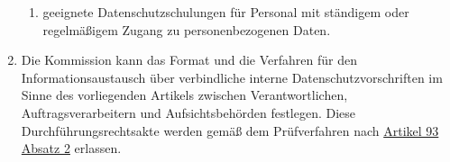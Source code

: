 \begin{enumerate}
\begin{enumerate}
    \item geeignete Datenschutzschulungen für Personal mit ständigem oder regelmäßigem Zugang zu personenbezogenen
     Daten.
    \label{itm:47-2n}

  \end{enumerate}

  \item Die Kommission kann das Format und die Verfahren für den Informationsaustausch über verbindliche interne
   Datenschutzvorschriften im Sinne des vorliegenden Artikels zwischen Verantwortlichen, Auftragsverarbeitern und
   Aufsichtsbehörden festlegen. Diese Durchführungsrechtsakte werden gemäß dem Prüfverfahren nach \hyperref[itm:93-2]
   {Artikel 93 Absatz 2} erlassen.
  \label{itm:47-3}

\end{enumerate}


